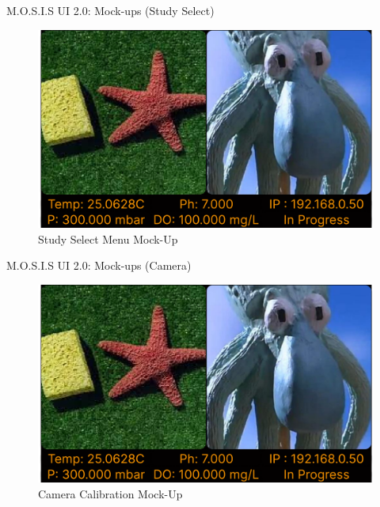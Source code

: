 \documentclass[17pt, aspectratio=169]{beamer}
\begin{document}
\begin{frame}{M.O.S.I.S UI 2.0: Mock-ups (Study Select)}
	\begin{figure}
		\includegraphics[page=2,height=0.65\textheight]{../../Progress_Report_Document/Appendix/Design_Documentation/User_Interface/Figures/M.O.S.I.S_UI_Design.pdf}
		\caption{Study Select Menu Mock-Up}
	\end{figure}
\end{frame}
\begin{frame}{M.O.S.I.S UI 2.0: Mock-ups (Camera)}
	\begin{figure}
		\includegraphics[page=3,height=0.65\textheight]{../../Progress_Report_Document/Appendix/Design_Documentation/User_Interface/Figures/M.O.S.I.S_UI_Design.pdf}
		\caption{Camera Calibration Mock-Up}
	\end{figure}
\end{frame}
\end{document}
